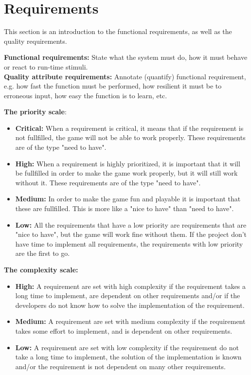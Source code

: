 \section{Requirements}

This section is an introduction to the functional requirements, as well as the quality requirements.

{\bf Functional requirements:} State what the system must do, how it must behave or react 
to run-time stimuli. \cite{functionalRequirement} \\

{\bf Quality attribute requirements:} Annotate (quantify) functional requirement, e.g. how fast 
the function must be performed, how resilient it must be to erroneous input, how easy the 
function is to learn, etc. \cite{nonFunctionalRequirement}

{\bf The priority scale}:
\begin{itemize}
	\item {\bf Critical:} When a requirement is critical, it means that if the requirement is
	not fullfilled, the game will not be able to work properly. These requirements are of the
	type "need to have".
	\item {\bf High:} When a requirement is highly prioritized, it is important that it will
	be fullfilled in order to make the game work properly, but it will still work without it.
	These requirements are of the type "need to have".
	\item {\bf Medium: } In order to make the game fun and playable it is important that these are 
	fullfilled. This is more like a "nice to have" than "need to have".
	\item {\bf Low:} All the requirements that have a low priority are requirements that are "nice to have",
	but the game will work fine without them. If the project don't have time to implement all
	requirements, the requirements with low priority are the first to go.
\end{itemize}

{\bf The complexity scale:}
\begin{itemize}
	\item {\bf High:} A requirement are set with high complexity if the requirement takes a long 
	time to implement, are dependent on other requirements and/or if the developers do not know
	how to solve the implementation of the requirement.
	\item {\bf Medium:} A requirement are set with medium complexity if the requirement takes 
	some effort to implement, and is dependent on other requirements.
	\item {\bf Low:} A requirement are set with low complexity if the requirement do not take
	a long time to implement, the solution of the implementation is known and/or the requirement
	is not dependent on many other requirements.
\end{itemize}
